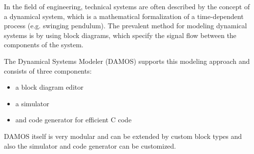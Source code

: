 %
In the field of engineering, technical systems are often described by the concept of a dynamical system, 
which is a mathematical formalization of a time-dependent process (e.g. swinging pendulum). The prevalent 
method for modeling dynamical systems is by using block diagrams, which specify the signal flow between 
the components of the system.

The Dynamical Systems Modeler (DAMOS) supports this modeling approach and consists of three components:
\begin {itemize}
\item a block diagram editor
\item a simulator
\item and code generator for efficient C code 
\end{itemize}

DAMOS itself is very modular and can be extended by custom block types and also the simulator and code generator can be customized. 